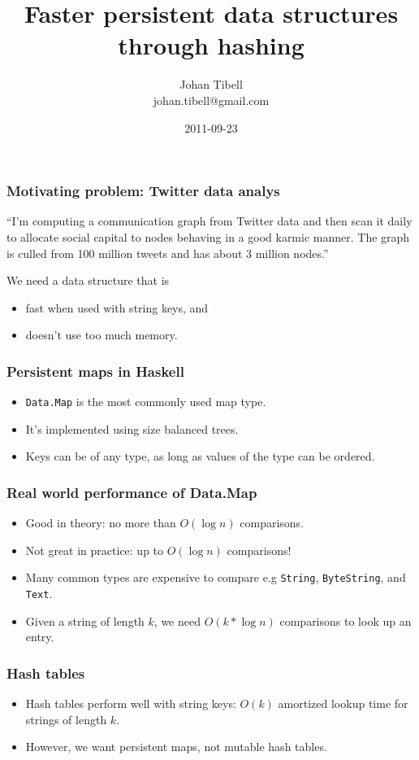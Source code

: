 \documentclass[xetex,mathserif,serif]{beamer}
\title{Faster persistent data structures through hashing}
\author{Johan Tibell\\johan.tibell@gmail.com}
\date{2011-09-23}
\begin{document}
\lstset{language=Haskell,keywordstyle=}

\frame{\titlepage}

\begin{frame}
  \frametitle{Motivating problem: Twitter data analys}

  ``I'm computing a communication graph from Twitter data and then
  scan it daily to allocate social capital to nodes behaving in a good
  karmic manner.  The graph is culled from 100 million tweets and has
  about 3 million nodes.''

  \bigskip
  We need a data structure that is
  \begin{itemize}
  \item fast when used with string keys, and
  \item doesn't use too much memory.
  \end{itemize}
\end{frame}

\begin{frame}
  \frametitle{Persistent maps in Haskell}

  \begin{itemize}
  \item \lstinline!Data.Map! is the most commonly used map type.
  \item It's implemented using size balanced trees.
  \item Keys can be of any type, as long as values of the type can be
    ordered.
  \end{itemize}
\end{frame}

\begin{frame}
  \frametitle{Real world performance of Data.Map}

  \begin{itemize}
  \item Good in theory: no more than $O(\log n)$ comparisons.
  \item Not great in practice: up to $O(\log n)$ comparisons!
  \item Many common types are expensive to compare e.g
    \lstinline!String!, \lstinline!ByteString!, and \lstinline!Text!.
  \item Given a string of length $k$, we need $O(k*\log n)$
    comparisons to look up an entry.
  \end{itemize}
\end{frame}

\begin{frame}
  \frametitle{Hash tables}
  \begin{itemize}
  \item Hash tables perform well with string keys: $O(k)$ amortized
    lookup time for strings of length $k$.
  \item However, we want persistent maps, not mutable hash tables.
  \end{itemize}
\end{frame}
\end{document}
